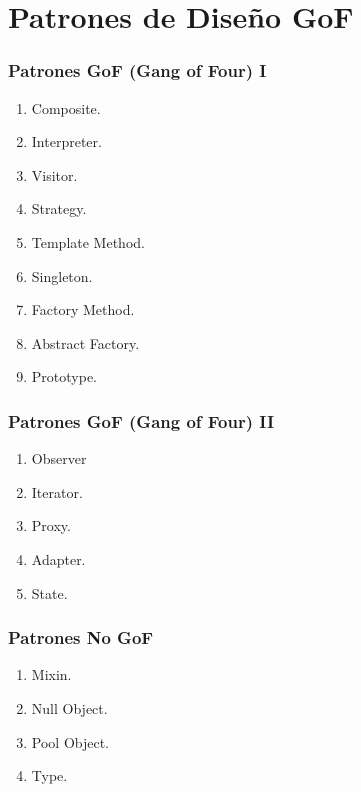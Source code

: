 ﻿\documentclass[animated,a4paper,slidestop,xcolor=pst,blue]{beamer}
\begin{document}
\section{Patrones de Diseño GoF}

\begin{frame}[c]
	\frametitle{Patrones GoF (Gang of Four) I}
	\begin{enumerate}
		\item Composite.
		\item Interpreter.
		\item Visitor.
		\item Strategy.
		\item Template Method.
        \item Singleton.
        \item Factory Method.
        \item Abstract Factory.
        \item Prototype.
	\end{enumerate}
\end{frame}

\begin{frame}[c]
	\frametitle{Patrones GoF (Gang of Four) II}
	\begin{enumerate}
        \item Observer
        \item Iterator.
        \item Proxy.
        \item Adapter.
        \item State.
	\end{enumerate}
\end{frame}

\begin{frame}[c]
	\frametitle{Patrones No GoF}
	\begin{enumerate}
		\item Mixin.
        \item Null Object.
		\item Pool Object.
        \item Type.
	\end{enumerate}
\end{frame}
\end{document}
